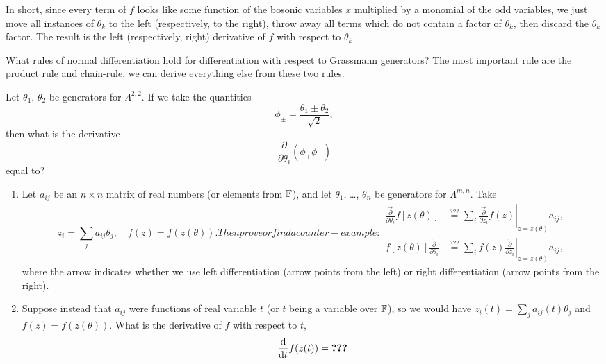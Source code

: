 In short, since every term of $f$ looks like some function of the
bosonic variables $x$ multiplied by a monomial of the odd variables, we
just move all instances of $\theta_{k}$ to the left (respectively, to the right), throw
away all terms which do not contain a factor of $\theta_{k}$, then
discard the $\theta_{k}$ factor. The result is the left (respectively,
right) derivative of $f$ with respect to $\theta_{k}$.

\begin{puzzle}
What rules of normal differentiation hold for differentiation with
respect to Grassmann generators? The most important rule are the product
rule and chain-rule, we can derive everything else from these two rules.
\end{puzzle}

\begin{exercise}
Let $\theta_{1}$, $\theta_{2}$ be generators for $\Lambda^{2,2}$.
If we take the quantities
\begin{equation}
\phi_{\pm} = \frac{\theta_{1}\pm\theta_{2}}{\sqrt{2}},
\end{equation}
then what is the derivative
\begin{equation*}
\frac{\partial}{\partial\theta_{i}}(\phi_{+}\phi_{-})
\end{equation*}
equal to?
\end{exercise}

\begin{exercise}
  \begin{enumerate}
  \item  Let $a_{ij}$ be an $n\times n$ matrix of real numbers (or elements
  from $\mathbb{F}$), and let $\theta_{1}$, \dots, $\theta_{n}$ be generators
  for $\Lambda^{m,n}$. Take
\begin{subequations}
  \begin{equation}
z_{i} = \sum_{j}a_{ij}\theta_{j},\quad f(z)=f(z(\theta)).
  \end{equation}
  Then prove or find a counter-example:
  \begin{align}
    \frac{\overrightarrow{\partial}}{\partial\theta_{i}}f[z(\theta)] &\stackrel{???}{=} \sum_{i}\left.\frac{\overrightarrow{\partial}}{\partial z_{i}}f(z)\right|_{z=z(\theta)}a_{ij},\\
    f[z(\theta)]\frac{\overleftarrow{\partial}}{\partial\theta_{i}} &\stackrel{???}{=} \sum_{i}\left.f(z)\frac{\overleftarrow{\partial}}{\partial z_{i}}\right|_{z=z(\theta)}a_{ij},
  \end{align}
\end{subequations}
where the arrow indicates whether we use left differentiation (arrow
points from the left) or right differentiation (arrow points from the right).
\item Suppose instead that $a_{ij}$ were functions of real variable $t$ (or
  $t$ being a variable over $\mathbb{F}$), so we would have $z_{i}(t) = \sum_{j}a_{ij}(t)\theta_{j}$
  and $f(z) = f(z(\theta))$. What is the derivative of $f$ with respect
  to $t$,
  \begin{equation*}
\frac{\mathrm{d}}{\mathrm{d} t}f(z(t)) = \hbox{\bfseries ???}
  \end{equation*}
\end{enumerate}
\end{exercise}

